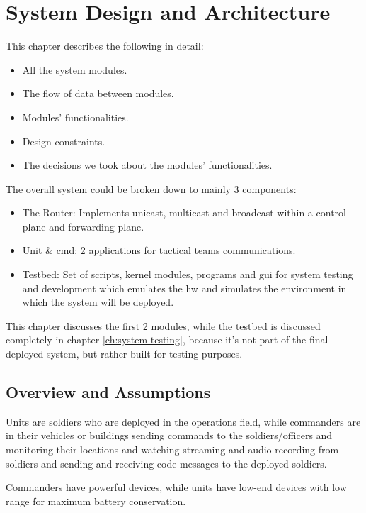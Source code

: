 \chapter{System Design and Architecture}
\label{ch:system-design}

This chapter describes the following in detail:
\begin{itemize}[itemsep=1pt, topsep=5pt]
    \item All the system modules.
    \item The flow of data between modules.
    \item Modules' functionalities.
    \item Design constraints.
    \item The decisions we took about the modules' functionalities.
\end{itemize}

The overall system could be broken down to mainly 3 components:
\begin{itemize}[itemsep=1pt, topsep=5pt]
    \item The Router: Implements unicast, multicast and broadcast within a control plane and forwarding plane.
    \item Unit \& \acrfull{cmd}: 2 applications for tactical teams communications.
    \item Testbed: Set of scripts, kernel modules, programs and \acrfull{gui} for system testing and development which emulates the \acrfull{hw} and simulates the environment in which the system will be deployed.
\end{itemize}

This chapter discusses the first 2 modules, while the testbed is discussed completely in chapter \ref{ch:system-testing}, because it's not part of the final deployed system, but rather built for testing purposes.

\section{Overview and Assumptions}
Units are soldiers who are deployed in the operations field, while commanders are in their vehicles or buildings sending commands to the soldiers/officers and monitoring their locations and watching streaming and audio recording from soldiers and sending and receiving code messages to the deployed soldiers.

Commanders have powerful devices, while units have low-end devices with low range for maximum battery conservation.

